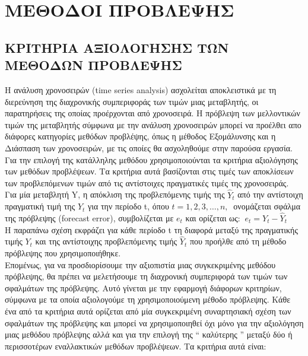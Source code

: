 
\chapter{ΜΕΘΟΔΟΙ ΠΡΟΒΛΕΨΗΣ}
\section{ ΚΡΙΤΗΡΙΑ ΑΞΙΟΛΟΓΗΣΗΣ ΤΩΝ ΜΕΘΟΔΩΝ ΠΡΟΒΛΕΨΗΣ}
Η ανάλυση χρονοσειρών (time series analysis) ασχολείται αποκλειστικά με τη
διερεύνηση της διαχρονικής συμπεριφοράς των τιμών μιας μεταβλητής, οι
παρατηρήσεις της οποίας προέρχονται από χρονοσειρά. Η πρόβλεψη των
μελλοντικών τιμών της μεταβλητής σύμφωνα με την ανάλυση χρονοσειρών μπορεί
να προέλθει απο διάφορες κατηγορίες μεθόδων προβλέψης, όπως η μέθοδος Εξομάλυνσης και η Διάσπαση των χρονοσειρών, με τις οποίες θα ασχοληθούμε στην παρούσα εργασία.\\
Για την επιλογή της κατάλληλης μεθόδου χρησιμοποιούνται τα κριτήρια
αξιολόγησης των μεθόδων προβλέψεων. Τα κριτήρια αυτά βασίζονται στις τιμές των
αποκλίσεων των προβλεπόμενων τιμών από τις αντίστοιχες πραγματικές τιμές της
χρονοσειράς.\\
Για μία μεταβλητή Y, η απόκλιση της προβλεπόμενης τιμής της $ \widehat{Y}_t $  από την
αντίστοιχη πραγματική τιμή της $Y_t$ για την περίοδο t, όπου $t=1,2,3,\ldots,n , \:$ ονομάζεται
σφάλμα της πρόβλεψης (forecast error), συμβολίζεται με $e_t$ και ορίζεται ως:
$\: e_t = Y_t - \widehat{Y}_t$\\
Η παραπάνω σχέση εκφράζει για κάθε περίοδο t τη διαφορά μεταξύ της πραγματικής
τιμής $Y_t$ και της αντίστοιχης προβλεπόμενης τιμής $ \widehat{Y}_t $ που προήλθε από τη μέθοδο
πρόβλεψης που χρησιμοποιήθηκε.\\
Επομένως, για να προσδιορίσουμε την αξιοπιστία μιας συγκεκριμένης μεθόδου
πρόβλεψης, θα πρέπει να μελετήσουμε τη διαχρονική συμπεριφορά των τιμών των
σφαλμάτων της πρόβλεψης. Αυτό γίνεται με την εφαρμογή διάφορων κριτηρίων,
σύμφωνα με τα οποία αξιολογούμε τη χρησιμοποιούμενη μέθοδο πρόβλεψης. Κάθε
ένα από τα κριτήρια αυτά ορίζεται από μία συγκεκριμένη συναρτησιακή σχέση των
σφαλμάτων της πρόβλεψης και μπορεί να χρησιμοποιηθεί όχι μόνο για την
αξιολόγηση μιας μεθόδου πρόβλεψης αλλά και για την επιλογή της “ καλύτερης ”
μεταξύ δύο ή περισσοτέρων εναλλακτικών μεθόδων προβλέψεων. Τα κριτήρια αυτά
είναι:\\
